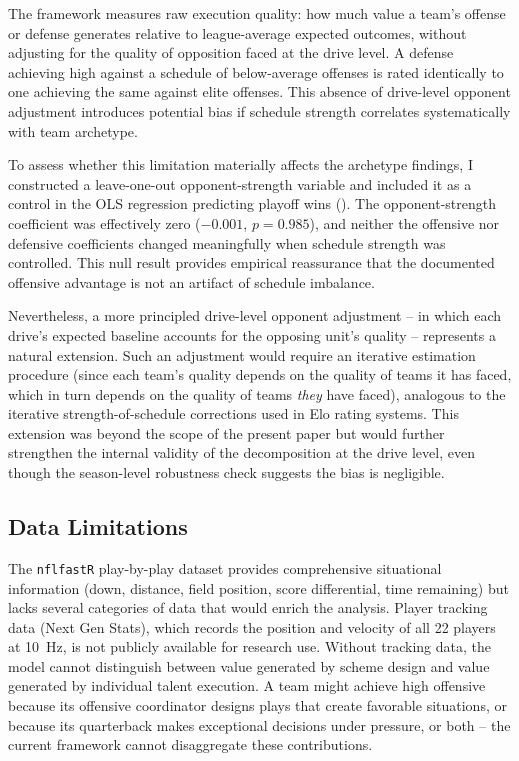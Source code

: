 The \gds{} framework measures raw execution quality: how much value a team's
offense or defense generates relative to league-average expected outcomes, without
adjusting for the quality of opposition faced at the drive level. A defense
achieving high \xvoa{} against a schedule of below-average offenses is rated
identically to one achieving the same \xvoa{} against elite offenses. This
absence of drive-level opponent adjustment introduces potential bias if schedule
strength correlates systematically with team archetype.

To assess whether this limitation materially affects the archetype findings, I
constructed a leave-one-out opponent-strength variable and included it as a
control in the OLS regression predicting playoff wins
(). The opponent-strength coefficient was
effectively zero ($-0.001$, $p = 0.985$), and neither the offensive nor
defensive \xvoa{} coefficients changed meaningfully when schedule strength was
controlled. This null result provides empirical reassurance that the documented
offensive advantage is not an artifact of schedule imbalance.

Nevertheless, a more principled drive-level opponent adjustment -- in which each
drive's expected baseline accounts for the opposing unit's quality -- represents
a natural extension. Such an adjustment would require an iterative estimation
procedure (since each team's quality depends on the quality of teams it has
faced, which in turn depends on the quality of teams \emph{they} have faced),
analogous to the iterative strength-of-schedule corrections used in Elo rating
systems. This extension was beyond the scope of the present paper but would
further strengthen the internal validity of the \gds{} decomposition at the
drive level, even though the season-level robustness check suggests the bias is
negligible.

\subsection{Data Limitations}
\label{sec:lim-data}

The \texttt{nflfastR} play-by-play dataset provides comprehensive
situational information (down, distance, field position, score
differential, time remaining) but lacks several categories of data that
would enrich the analysis.
Player tracking data (Next Gen Stats), which records the position and velocity
of all 22 players at 10~Hz, is not publicly available for research use. Without
tracking data, the model cannot distinguish between value generated by scheme
design and value generated by individual talent execution. A team might achieve
high offensive \xvoa{} because its offensive coordinator designs plays that
create favorable situations, or because its quarterback makes exceptional
decisions under pressure, or both -- the current framework cannot disaggregate
these contributions.

